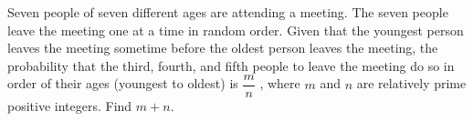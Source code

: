 Seven people of seven different ages are attending a meeting. The seven people leave the meeting one at a time in random order. Given that the youngest person leaves the meeting sometime before the oldest person leaves the meeting, the probability that the third, fourth, and fifth people to leave the meeting do so in order of their ages (youngest to oldest) is $\dfrac{m}{n}$ , where $m$ and $n$ are relatively prime positive integers. Find $m + n$.
